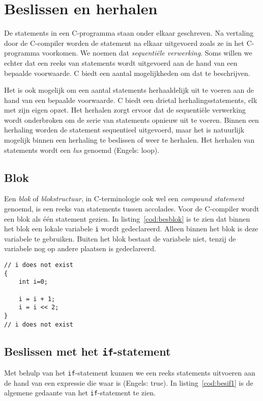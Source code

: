 \chapter{Beslissen en herhalen}
\label{cha:programmabesturing}
\thispagestyle{empty}

De statements in een C-programma staan onder elkaar geschreven. Na vertaling door de C-compiler worden de statement na elkaar uitgevoerd zoals ze in het C-programma voorkomen. We noemen dat \textsl{sequentiële verwerking}. Soms willen we echter dat een reeks van statements wordt uitgevoerd aan de hand van een bepaalde voorwaarde. C biedt een aantal mogelijkheden om dat te beschrijven.

Het is ook mogelijk om een aantal statements herhaaldelijk uit te voeren aan de hand van een bepaalde voorwaarde. C biedt een drietal herhalingsstatements, elk met zijn eigen opzet. Het herhalen zorgt ervoor dat de sequentiële verwerking wordt onderbroken om de serie van statements opnieuw uit te voeren. Binnen een herhaling worden de statement sequentieel uitgevoerd, maar het is natuurlijk mogelijk binnen een herhaling te beslissen of weer te herhalen. Het herhalen van statements wordt een \textsl{lus} genoemd (Engels: loop).


\section{Blok}
Een \textsl{blok} of \textsl{blokstructuur}, in C-terminologie ook wel een \textsl{compound statement} genoemd, is een reeks van statements tussen accolades. Voor de C-compiler wordt een blok als één statement gezien. In listing~\ref{cod:besblok} is te zien dat binnen het blok een lokale variabele \texttt{i} wordt gedeclareerd. Alleen binnen het blok is deze variabele te gebruiken. Buiten het blok bestaat de variabele niet, tenzij de variabele nog op andere plaatsen is gedeclareerd.


\begin{lstlisting}[caption=Een blok met een lokale variabele.,label=cod:besblok]
// i does not exist
{
    int i=0;
    
    i = i + 1;
    i = i << 2;
}
// i does not exist
\end{lstlisting}


\section{Beslissen met het \texttt{if}-statement}
Met behulp van het \texttt{if}-statement kunnen we een reeks statements uitvoeren aan de hand van een expressie die waar is (Engels: true). In listing~\ref{cod:besif1} is de algemene gedaante van het \texttt{if}-statement te zien.

